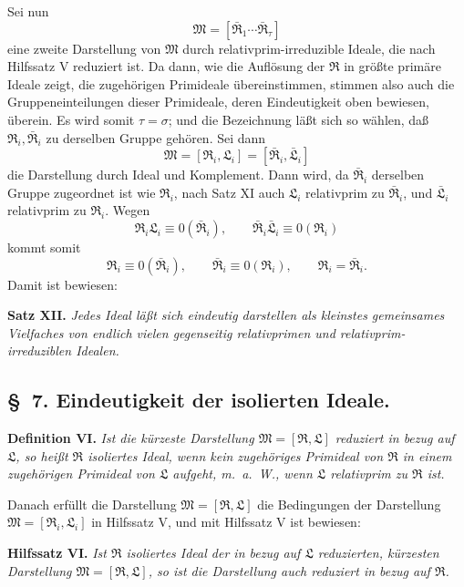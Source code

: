 \documentclass[11pt]{article}
\newcommand{\ideal}[1]{\mathfrak{#1}}
\begin{document}
Sei nun
\[
 \ideal M=[\bar{\ideal R}_1\cdots\bar{\ideal R}_\tau]
\]
eine zweite Darstellung von $\ideal M$ durch relativprim-irreduzible Ideale, die nach Hilfssatz V reduziert ist. Da dann, wie die Auflösung der $\ideal R$ in größte primäre Ideale zeigt, die zugehörigen Primideale übereinstimmen, stimmen also auch die Gruppeneinteilungen dieser Primideale, deren Eindeutigkeit oben bewiesen, überein. Es wird somit $\tau=\sigma$; und die Bezeichnung läßt sich so wählen, daß $\ideal R_i,
\bar{\ideal R}_i$ zu derselben Gruppe gehören. Sei dann
\[
 \ideal M=[\ideal R_i,
\ideal L_i]=[\bar{\ideal R}_i,
\bar{\ideal L}_i]
\]
die Darstellung durch Ideal und Komplement. Dann wird, da $\bar{\ideal R}_i$ derselben Gruppe zugeordnet ist wie $\ideal R_i$, nach Satz XI auch $\ideal L_i$ relativprim zu $\bar{\ideal R}_i$, und $\bar{\ideal L}_i$ relativprim zu $\ideal R_i$. Wegen
\[
 \ideal R_i\ideal L_i\equiv0(\bar{\ideal R}_i),
 \qquad
 \bar{\ideal R}_i\bar{\ideal L}_i\equiv0(\ideal R_i)
\]
kommt somit
\[
 \ideal R_i\equiv0(\bar{\ideal R}_i),
 \qquad
 \bar{\ideal R}_i\equiv0(\ideal R_i),
 \qquad
 \ideal R_i=\bar{\ideal R}_i.
\]
Damit ist bewiesen:

\textbf{Satz XII.} \emph{Jedes Ideal läßt sich eindeutig darstellen als kleinstes gemeinsames Vielfaches von endlich vielen gegenseitig relativprimen und relativprim-irreduziblen Idealen.}

\subsection*{\S~7. Eindeutigkeit der isolierten Ideale.}

\textbf{Definition VI.} \emph{Ist die kürzeste Darstellung $\ideal M=[\ideal R,\ideal L]$ reduziert in bezug auf $\ideal L$, so heißt $\ideal R$ isoliertes Ideal, wenn kein zugehöriges Primideal von $\ideal R$ in einem zugehörigen Primideal von $\ideal L$ aufgeht, m.~a.~W., wenn $\ideal L$ relativprim zu $\ideal R$ ist.}

Danach erfüllt die Darstellung $\ideal M=[\ideal R,\ideal L]$ die Bedingungen der Darstellung $\ideal M=[\ideal R_i,\ideal L_i]$ in Hilfssatz V, und mit Hilfssatz V ist bewiesen:

\textbf{Hilfssatz VI.} \emph{Ist $\ideal R$ isoliertes Ideal der in bezug auf $\ideal L$ reduzierten, kürzesten Darstellung $\ideal M=[\ideal R,\ideal L]$, so ist die Darstellung auch reduziert in bezug auf $\ideal R$.}
\end{document}
